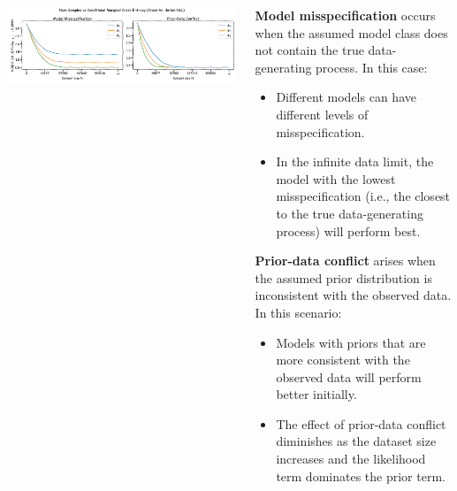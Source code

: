 \documentclass[25pt,a0paper,landscape]{tikzposter}
\begin{document}
\begin{columns}
{        \includegraphics[width=\linewidth]{prior_conflict_and_model_misspecification_0.67.png}
    \begin{multicols}{2}
      \begin{theorybox}[title=Model Misspecification]
        \textbf{Model misspecification} occurs when the assumed model class does not contain the true data-generating process. In this case:
        \begin{itemize}
          \item Different models can have different levels of misspecification.
          \item In the infinite data limit, the model with the lowest misspecification (i.e., the closest to the true data-generating process) will perform best.
        \end{itemize}
      \end{theorybox}
      \columnbreak
      \begin{theorybox}[title=Prior-Data Conflict]
        \textbf{Prior-data conflict} arises when the assumed prior distribution is inconsistent with the observed data. In this scenario:
        \begin{itemize}
        \item Models with priors that are more consistent with the observed data will perform better initially.
        \item The effect of prior-data conflict diminishes as the dataset size increases and the likelihood term dominates the prior term.
        \end{itemize}
      \end{theorybox}
    \end{multicols}
  }
\end{columns}
\end{document}
